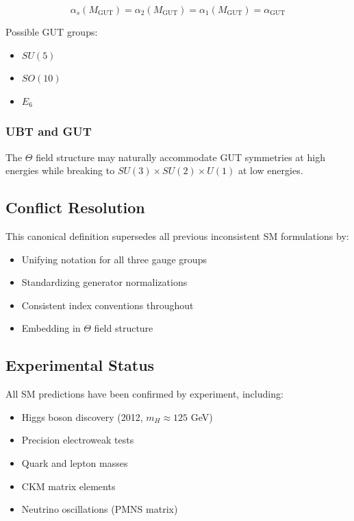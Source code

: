 \begin{equation}
\alpha_s(M_{\text{GUT}}) = \alpha_2(M_{\text{GUT}}) = \alpha_1(M_{\text{GUT}}) = \alpha_{\text{GUT}}
\end{equation}

Possible GUT groups:
\begin{itemize}
    \item $SU(5)$
    \item $SO(10)$
    \item $E_6$
\end{itemize}

\subsubsection{UBT and GUT}

The $\Theta$ field structure may naturally accommodate GUT symmetries at high energies while breaking to $SU(3) \times SU(2) \times U(1)$ at low energies.

\subsection{Conflict Resolution}

This canonical definition supersedes all previous inconsistent SM formulations by:

\begin{itemize}
    \item Unifying notation for all three gauge groups
    \item Standardizing generator normalizations
    \item Consistent index conventions throughout
    \item Embedding in $\Theta$ field structure
\end{itemize}

\subsection{Experimental Status}

All SM predictions have been confirmed by experiment, including:
\begin{itemize}
    \item Higgs boson discovery (2012, $m_H \approx 125$ GeV)
    \item Precision electroweak tests
    \item Quark and lepton masses
    \item CKM matrix elements
    \item Neutrino oscillations (PMNS matrix)
\end{itemize}

